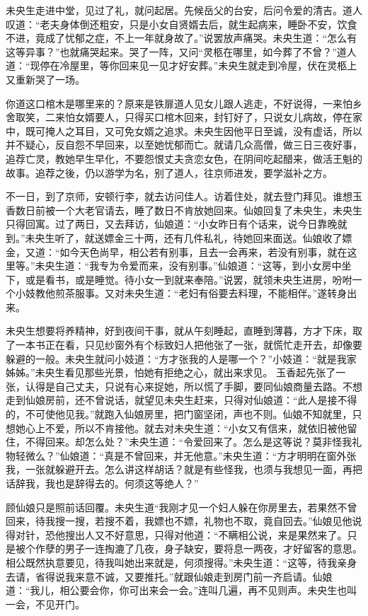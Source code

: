 \documentclass[a4paper,12pt,UTF8,twoside]{ctexbook}
\begin{document}
未央生走进中堂，见过了礼，就问起居。先候岳父的台安，后问令爱的清吉。道人叹道：“老夫身体倒还粗安，只是小女自贤婿去后，就生起病来，睡卧不安，饮食不进，竟成了忧郁之症，不上一年就身故了。”说罢放声痛哭。未央生道：“怎么有这等异事？”也就痛哭起来。哭了一阵，又问“灵柩在哪里，如今葬了不曾？”道人道：“现停在冷屋里，等你回来见一见才好安葬。”未央生就走到冷屋，伏在灵柩上又重新哭了一场。

你道这口棺木是哪里来的？原来是铁扉道人见女儿跟人逃走，不好说得，一来怕乡舍取笑，二来怕女婿要人，只得买口棺木回来，封钉好了，只说女儿病故，停在家中，既可掩人之耳目，又可免女婿之追求。未央生因他平日至诚，没有虚话，所以并不疑心，反自怨不早回来，以至她忧郁而亡。就请几众高僧，做三日三夜好事，追荐亡灵，教她早生早化，不要怨恨丈夫贪恋女色，在阴间吃起醋来，做活王魁的故事。追荐之後，仍以游学为名，别了道人，往京师进发，要学滋补之方。

不一日，到了京师，安顿行李，就去访问佳人。访着住处，就去登门拜见。谁想玉香数日前被一个大老官请去，睡了数日不肯放她回来。仙娘回复了未央生，未央生只得回寓。过了两日，又去拜访，仙娘道：“小女昨日有个话来，说今日靠晚就到。”未央生听了，就送嫖金三十两，还有几件私礼，待她回来面送。仙娘收了嫖金，又道：“如今天色尚早，相公若有别事，且去一会再来，若没有别事，就在这里等。”未央生道：“我专为令爱而来，没有别事。”仙娘道：“这等，到小女房中坐下，或是看书，或是睡觉。待小女一到就来奉陪。”说罢，就领未央生进房，吩咐一个小妓教他煎茶服事。又对未央生道：“老妇有俗要去料理，不能相伴。”遂转身出来。

未央生想要将养精神，好到夜间干事，就从午刻睡起，直睡到薄暮，方才下床，取了一本书正在看，只见纱窗外有个标致妇人把他张了一张，就慌忙走开去，却像要躲避的一般。未央生就问小妓道：“方才张我的人是哪一个？”小妓道：“就是我家姊姊。”未央生看见那些光景，怕她有拒绝之心，就出来求见。 玉香起先张了一张，认得是自己丈夫，只说有心来捉她，所以慌了手脚，要同仙娘商量去路。不想走到仙娘房前，还不曾说话，就望见未央生赶来，只得对仙娘道：“此人是接不得的，不可使他见我。”就跑入仙娘房里，把门窗坚闭，声也不则。仙娘不知就里，只想她心上不爱，所以不肯接他。就去对未央生道：“小女又有信来，就依旧被他留住，不得回来。却怎么处？”未央生道：“令爱回来了。怎么是这等说？莫非怪我礼物轻微么？”仙娘道：“真是不曾回来，并无他意。”未央生道：“方才明明在窗外张我，一张就躲避开去。怎么讲这样胡话？就是有些怪我，也须与我想见一面，再把话辞我，我也是辞得去的。何须这等绝人？”

顾仙娘只是照前话回覆。未央生道“我刚才见一个妇人躲在你房里去，若果然不曾回来，待我搜一搜，若搜不着，我嫖也不嫖，礼物也不取，竟自回去。”仙娘见他说得对针，恐他搜出人又不好意思，只得对他道：“不瞒相公说，来是果然来了。只是被个作孽的男子一连掏漉了几夜，身子缺安，要将息一两夜，才好留客的意思。相公既然执意要见，待我叫她出来就是，何须搜得。”未央生道：“这等，待我亲身去请，省得说我来意不诚，又要推托。”就跟仙娘走到房门前一齐启请。仙娘道：“我儿，相公要会你，你可出来会一会。”连叫几遍，再不见则声。未央生也叫一会，不见开门。
\end{document}
